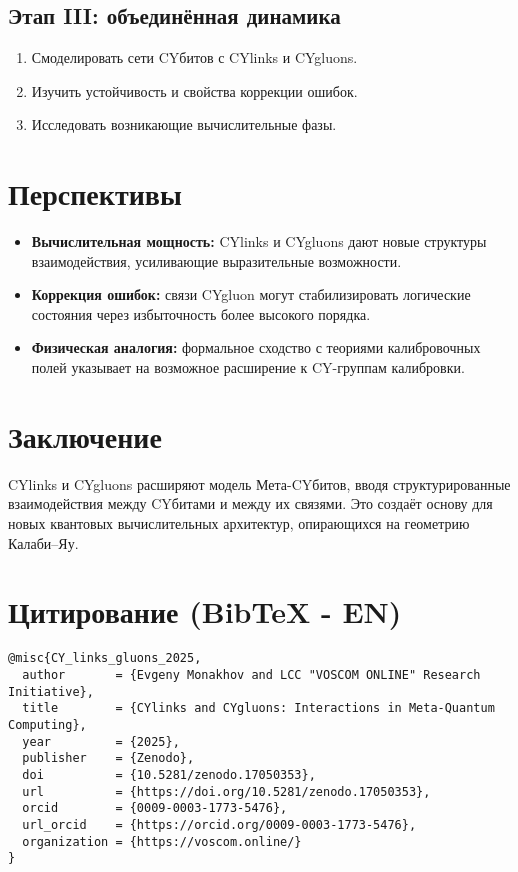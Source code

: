 \documentclass[12pt,a4paper]{article}
\begin{document}
\subsection{Этап III: объединённая динамика}
\begin{enumerate}
\item Смоделировать сети CYбитов с CYlinks и CYgluons.  
\item Изучить устойчивость и свойства коррекции ошибок.  
\item Исследовать возникающие вычислительные фазы.  
\end{enumerate}

\section{Перспективы}
\begin{itemize}
\item \textbf{Вычислительная мощность:} CYlinks и CYgluons дают новые структуры взаимодействия, усиливающие выразительные возможности.  
\item \textbf{Коррекция ошибок:} связи CYgluon могут стабилизировать логические состояния через избыточность более высокого порядка.  
\item \textbf{Физическая аналогия:} формальное сходство с теориями калибровочных полей указывает на возможное расширение к CY-группам калибровки.  
\end{itemize}

\section{Заключение}
CYlinks и CYgluons расширяют модель Мета-CYбитов, вводя структурированные взаимодействия 
между CYбитами и между их связями.  
Это создаёт основу для новых квантовых вычислительных архитектур, 
опирающихся на геометрию Калаби--Яу.  

\section*{Цитирование (BibTeX - EN)}
\begin{verbatim}
@misc{CY_links_gluons_2025,
  author       = {Evgeny Monakhov and LCC "VOSCOM ONLINE" Research Initiative},
  title        = {CYlinks and CYgluons: Interactions in Meta-Quantum Computing},
  year         = {2025},
  publisher    = {Zenodo},
  doi          = {10.5281/zenodo.17050353},
  url          = {https://doi.org/10.5281/zenodo.17050353},
  orcid        = {0009-0003-1773-5476},
  url_orcid    = {https://orcid.org/0009-0003-1773-5476},
  organization = {https://voscom.online/}
}
\end{verbatim}
\end{document}
